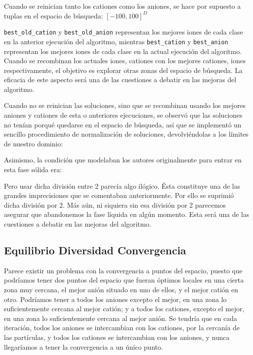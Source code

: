 \documentclass[a4paper,11pt]{article}
\begin{document}
\begin{itemize}
 Cuando se reinician tanto los cationes como los aniones, se hace por supuesto a tuplas en el espacio de búsqueda: $[-100,100]^D$
 
 \texttt{best\_old\_cation} y \texttt{best\_old\_anion} representan los mejores iones de cada clase en la anterior ejecución del
 algoritmo, mientras \texttt{best\_cation} y \texttt{best\_anion} representan los mejores iones de cada clase en la actual 
 ejecución del algoritmo. Cuando se recombinan los actuales iones, cationes con los mejores cationes, iones respectivamente,
 el objetivo es explorar otras zonas del espacio de búsqueda. La eficacia de este aspecto será una de las cuestiones a debatir
 en las mejoras del algoritmo.
 
 Cuando no se reinician las soluciones, sino que se recombinan usando los mejores aniones y cationes de esta o anteriores ejecuciones,
 se observó que las soluciones no tenían porqué quedarse en el espacio de búsqueda, así que se implementó un sencillo procedimiento
 de normalización de soluciones, devolviéndolas a los límites de nuestro dominio:
 
  \small{\texttt{}}
  \normalsize
 
 Asimismo, la condición que modelaban los autores originalmente para entrar en esta fase sólida era:
 
  \small{\texttt{}}
  \normalsize
  
 Pero usar dicha división entre 2 parecía algo ilógico. Ésta constituye una de las grandes imprecisiones que se comentaban
 anteriormente. Por ello se suprimió dicha división por 2. Más aún, ni siquiera sin esa división por 2 parecemos asegurar que abandonemos
 la fase líquida en algún momento. Esta será una de las cuestiones a debatir en las mejoras del algoritmo.
\end{itemize} 
 
 \subsection{Equilibrio Diversidad Convergencia}
 
  Parece existir un problema con la convergencia a puntos del espacio, puesto que podríamos tener dos puntos del espacio que
  fueran óptimos locales en una cierta zona muy cercana, el mejor anión situado en uno de ellos, y el mejor catión en otro.
  Podríamos tener a todos los aniones excepto el mejor, en una zona lo suficientemente cercana al mejor catión; y a todos
  los cationes, excepto el mejor, en una zona lo suficientemente cercana al mejor anión. Se tendría que en cada iteración,
  todos los aniones se intercambian con los cationes, por la cercanía de las partículas, y todos los cationes se intercambian
  con los aniones, y nunca llegaríamos a tener la convergencia a un único punto.
  
\end{document}

